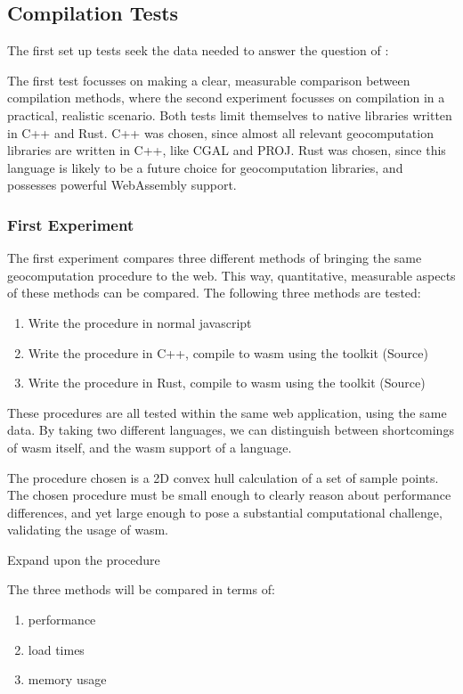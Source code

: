 \subsection{Compilation Tests}

The first set up tests seek the data needed to answer the question of \mySubRQTwoTitle: \mySubRQTwo

The first test focusses on making a clear, measurable comparison between compilation methods, where the second experiment focusses on compilation in a practical, realistic scenario. 
Both tests limit themselves to native libraries written in C++ and Rust. 
C++ was chosen, since almost all relevant geocomputation libraries are written in C++, like CGAL and PROJ. 
Rust was chosen, since this language is likely to be a future choice for geocomputation libraries, and possesses powerful WebAssembly support. 


\subsubsection{First Experiment}
The first experiment compares three different methods of bringing the same geocomputation procedure to the web. 
This way, quantitative, measurable aspects of these methods can be compared. 
The following three methods are tested:
\begin{enumerate}[-]
  \item Write the procedure in normal javascript
  \item Write the procedure in C++, compile to wasm using the  toolkit (Source)
  \item Write the procedure in Rust, compile to wasm using the  toolkit (Source)
\end{enumerate}
These procedures are all tested within the same web application, using the same data. 
By taking two different languages, we can distinguish between shortcomings of \ac{wasm} itself, and the \ac{wasm} support of a language.  

The procedure chosen is a 2D convex hull calculation of a set of sample points. 
The chosen procedure must be small enough to clearly reason about performance differences, and yet large enough to pose a substantial computational challenge, validating the usage of \ac{wasm}.

\begin{note}
  Expand upon the procedure
\end{note}

The three methods will be compared in terms of:
\begin{enumerate}[-]
  \item performance
  \item load times
  \item memory usage
\end{enumerate}

